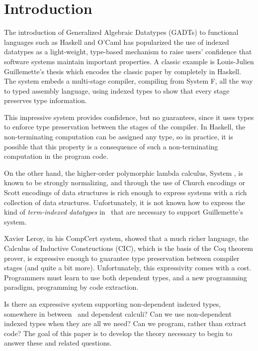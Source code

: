 \section{Introduction}
\label{sec:intro}


The introduction of Generalized Algebraic Datatypes (GADTs) to
functional languages such as Haskell and O'Caml has popularized
the use of indexed datatypes as a light-weight, type-based mechanism
to raise users' confidence that software systems maintain important properties.
A classic example is Louis-Julien Guillemette's thesis \cite{guillemetteThesis}
which encodes the classic paper by \citet{tal-toplas} completely
in Haskell. The system embeds a multi-stage compiler, compiling from System F,
all the way to typed assembly language, using indexed types to show that
every stage preserves type information.

This impressive system provides confidence, but no guarantees, since it uses
types to enforce type preservation between the stages of the compiler.
In Haskell, the non-terminating computation can be assigned any type,
so in practice, it is possible that this property is a consequence of
such a non-terminating computation in the program code.

On the other hand, the higher-order polymorphic lambda calculus, System \Fw,
is known to be strongly normalizing, and through the use of Church encodings
or Scott encodings of data structures is rich enough to express
systems with a rich collection of data structures.
Unfortunately, it is not known how to express the kind of
\emph{term-indexed datatypes} in \Fw\ that are necessary to support
Guillemette's system.

Xavier Leroy, in his CompCert system\cite{Leroy-Compcert-CACM}, showed that
a much richer language, the Calculus of Inductive Constructions (CIC), which
is the basis of the Coq theorem prover, is expressive enough to guarantee
type preservation between compiler stages (and quite a bit more).
Unfortunately, this expressivity comes with a cost. Programmers must learn to
use both dependent types, and a new programming paradigm, programming by
code extraction.

Is there an expressive system supporting non-dependent indexed types,
somewhere in between \Fw\ and dependent calculi?
Can we use non-dependent indexed types when they are all we need?
Can we program, rather than extract code? The goal of this paper is
to develop the theory necessary to begin to answer these and related questions.

